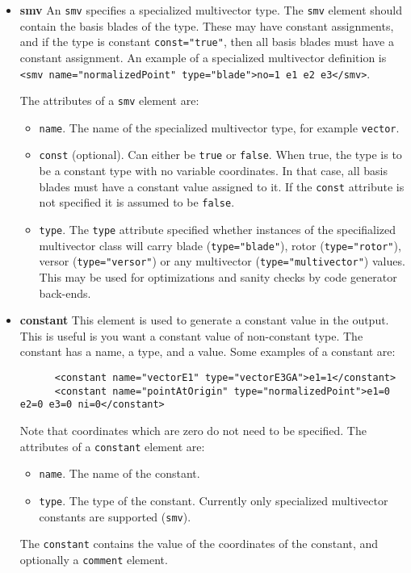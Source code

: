 \documentclass[10pt, a4paper]{article}
\begin{document}
\begin{itemize}
         
\item {\bf smv} An {\tt smv} specifies a specialized multivector type. 
      The {\tt smv} element should contain the basis blades of the type. These may have constant assignments, and if the
      type is constant {\tt const="true"}, then all basis blades must have a constant assignment. An example of a specialized
      multivector definition is {\tt <smv name="normalizedPoint" type="blade">no=1 e1 e2 e3</smv>}.
      
      The attributes of a {\tt smv} element are:
       \begin{itemize}
       \item {\tt name}. The name of the specialized multivector type, for example {\tt vector}.
       \item {\tt const} (optional). Can either be {\tt true} or {\tt false}. When true, the type is to be a constant type with no
           variable coordinates. In that case, all basis blades must have a constant value assigned to it. If the {\tt const}
           attribute is not specified it is assumed to be {\tt false}.
       \item {\tt type}. The {\tt type} attribute specified whether instances of the specifialized multivector class will carry
           blade ({\tt type="blade"}), rotor ({\tt type="rotor"}), versor ({\tt type="versor"}) or any multivector 
           ({\tt type="multivector"}) values. This may be used for optimizations and sanity checks by code generator back-ends.
       \end{itemize}
       
\item {\bf constant} This element is used to generate a constant value in the output. This is useful is you
      want a constant value of non-constant type. The constant has a name, 
      a type, and a value. Some examples of a constant are:
      \begin{verbatim}
      <constant name="vectorE1" type="vectorE3GA">e1=1</constant>
      <constant name="pointAtOrigin" type="normalizedPoint">e1=0 e2=0 e3=0 ni=0</constant>
      \end{verbatim}
      Note that coordinates which are zero do not need to be specified. The attributes of a {\tt constant} element are:
      
       \begin{itemize}
       \item {\tt name}. The name of the constant.
       \item {\tt type}. The type of the constant. Currently only specialized multivector constants are supported ({\tt smv}).
       \end{itemize}
      The {\tt constant} contains the value of the coordinates of the constant, and optionally a {\tt comment} element.
      

\end{itemize}
\end{document}
